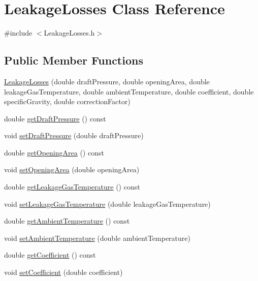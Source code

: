 \hypertarget{class_leakage_losses}{}\section{Leakage\+Losses Class Reference}
\label{class_leakage_losses}


{\ttfamily \#include $<$Leakage\+Losses.\+h$>$}

\subsection*{Public Member Functions}
\begin{DoxyCompactItemize}
\item 
\hyperlink{class_leakage_losses_ab29a3d7c9561d73f2530fc376b528510}{Leakage\+Losses} (double draft\+Pressure, double opening\+Area, double leakage\+Gas\+Temperature, double ambient\+Temperature, double coefficient, double specific\+Gravity, double correction\+Factor)
\item 
double \hyperlink{class_leakage_losses_a0ec89fc6371c4a788e1bb861c7cfba35}{get\+Draft\+Pressure} () const
\item 
void \hyperlink{class_leakage_losses_a33f31dc336fc6af0fd1e8c8739f37b1a}{set\+Draft\+Pressure} (double draft\+Pressure)
\item 
double \hyperlink{class_leakage_losses_a6b31fbefaa16a5a52ce423b9531e84fa}{get\+Opening\+Area} () const
\item 
void \hyperlink{class_leakage_losses_a417c9914af6b283695bdbd5e92451f9e}{set\+Opening\+Area} (double opening\+Area)
\item 
double \hyperlink{class_leakage_losses_a5dbb249c07bc91611b71d62610af7234}{get\+Leakage\+Gas\+Temperature} () const
\item 
void \hyperlink{class_leakage_losses_a379c88c8dea822636a1b9966e2408daa}{set\+Leakage\+Gas\+Temperature} (double leakage\+Gas\+Temperature)
\item 
double \hyperlink{class_leakage_losses_af67ad0af750484b13dd311c881f71c61}{get\+Ambient\+Temperature} () const
\item 
void \hyperlink{class_leakage_losses_aa6028111b3eb305d9ea6f9efea7c6c66}{set\+Ambient\+Temperature} (double ambient\+Temperature)
\item 
double \hyperlink{class_leakage_losses_a7f70af7175574e0c4447a322586ac01e}{get\+Coefficient} () const
\item 
void \hyperlink{class_leakage_losses_add2e96e75b6dd965370340dc03717434}{set\+Coefficient} (double coefficient)

\end{DoxyCompactItemize}
